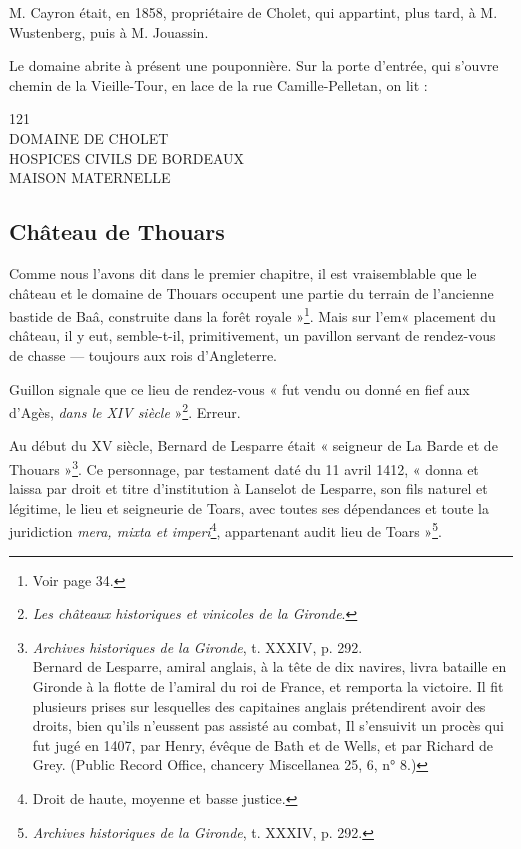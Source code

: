 M. Cayron était, en 1858, propriétaire de Cholet, qui appartint, plus tard, à M. Wustenberg, puis à M. Jouassin.

Le domaine abrite à présent une pouponnière. Sur la porte d'entrée, qui s'ouvre chemin de la Vieille-Tour, en lace de la rue Camille-Pelletan, on lit : 

\begin{center}
121\\DOMAINE DE CHOLET\\HOSPICES CIVILS DE BORDEAUX\\MAISON MATERNELLE
\end{center}

\subsection{Château de Thouars}

Comme nous l'avons dit dans le premier chapitre, il est vraisemblable que le château et le domaine de Thouars occupent une partie du terrain de l'ancienne bastide de Baâ, construite dans la forêt royale »\footnote{Voir page 34.}. Mais sur l'em« placement du château, il y eut, semble-t-il, primitivement, un pavillon servant de rendez-vous de chasse — toujours aux rois d'Angleterre.

Guillon signale que ce lieu de rendez-vous « fut vendu ou donné en fief aux d'Agès, \textit{dans le XIV\ieme{} siècle} »\footnote{\textit{Les châteaux historiques et vinicoles de la Gironde}.}. Erreur. 

Au début du XV\ieme{} siècle, Bernard de Lesparre était « seigneur de La Barde et de Thouars »\footnote{\textit{Archives historiques de la Gironde}, t. XXXIV, p. 292.\\Bernard de Lesparre, amiral anglais, à la tête de dix navires, livra bataille en Gironde à la flotte de l'amiral du roi de France, et remporta la victoire. Il fit plusieurs prises sur lesquelles des capitaines anglais prétendirent avoir des droits, bien qu'ils n'eussent pas assisté au combat, Il s'ensuivit un procès qui fut jugé en 1407, par Henry, évêque de Bath et de Wells, et par Richard de Grey. (Public Record Office, chancery Miscellanea 25, 6, n° 8.)}. Ce personnage, par testament daté du 11 avril 1412, « donna et laissa par droit et titre d'institution à Lanselot de Lesparre, son fils naturel et légitime, le lieu et seigneurie de Toars, avec toutes ses dépendances et toute la juridiction \textit{mera, mixta et imperi}\footnote{Droit de haute, moyenne et basse justice.}, appartenant audit lieu de Toars »\footnote{\textit{Archives historiques de la Gironde}, t. XXXIV, p. 292.}.

